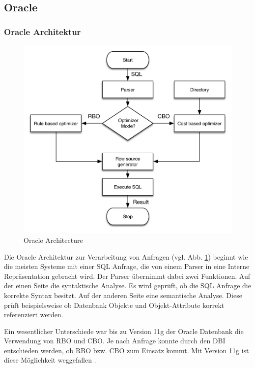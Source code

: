 \subsection{Oracle}
\subsubsection{Oracle Architektur}


\begin{figure}[ht]
  \centering
  \includegraphics[width=\textwidth]{02_Related_Work/Oracle.pdf}
  \caption{Oracle Architecture \cite{Oracle2004Basics}}
  \label{OracleArchitecture}
\end{figure}


Die Oracle Architektur zur Verarbeitung von Anfragen \cite{Oracle2004Basics}  (vgl. Abb. \ref{OracleArchitecture})  beginnt wie die meisten Systeme mit einer SQL Anfrage, die von einem Parser in eine Interne Repräsentation gebracht wird. Der Parser übernimmt dabei zwei Funktionen. Auf der einen Seite die syntaktische Analyse. Es wird geprüft, ob die SQL Anfrage die korrekte Syntax besitzt. Auf der anderen Seite eine semantische Analyse. Diese prüft beispielsweise ob Datenbank Objekte und Objekt-Attribute  korrekt referenziert werden. 

Ein wesentlicher Unterschiede war bis zu Version 11g der Oracle Datenbank die Verwendung von \ac{RBO} und \ac{CBO}. Je nach Anfrage konnte durch den \ac{DBI} entschieden werden, ob \ac{RBO} bzw. \ac{CBO} zum Einsatz kommt. Mit Version 11g ist diese Möglichkeit weggefallen \cite{dba_oracle2015}. 

